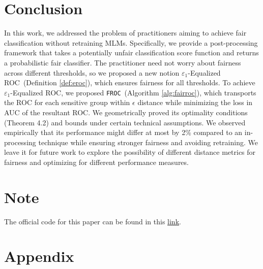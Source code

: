 \documentclass{article}
\newcommand{\ouralgo}{\texttt{FROC}}
\newcommand{\ourdef}{-Equalized ROC}
\begin{document}
\section{Conclusion}
In this work, we addressed the problem of practitioners aiming to achieve fair classification without retraining MLMs. Specifically, we provide a post-processing framework that takes a potentially unfair classification score function and returns a probabilistic fair classifier. 
The practitioner need not worry about fairness across different thresholds, so we proposed a new notion $\varepsilon_1$\ourdef\ (Definition \ref{def:eroc}), which ensures fairness for all thresholds. To achieve $\varepsilon_1$\ourdef, we proposed \ouralgo\ (Algorithm \ref{alg:fairroc}), which transports the ROC for each sensitive group within $\epsilon$ distance while minimizing the loss in AUC of the resultant ROC. 
We geometrically proved its optimality conditions (Theorem 4.2) and bounds under certain technical assumptions. We observed empirically that its performance might differ at most by 2\% compared to an in-processing technique while ensuring stronger fairness and avoiding retraining. We leave it for future work to explore the possibility of different distance metrics for fairness and optimizing for different performance measures. 


\section*{Note}
The official code for this paper can be found in this \href{https://github.com/Avyukta-Manjunatha-Vummintala/FROC_code/tree/main}{link}.
\newpage
\section*{Appendix}


\end{document}
